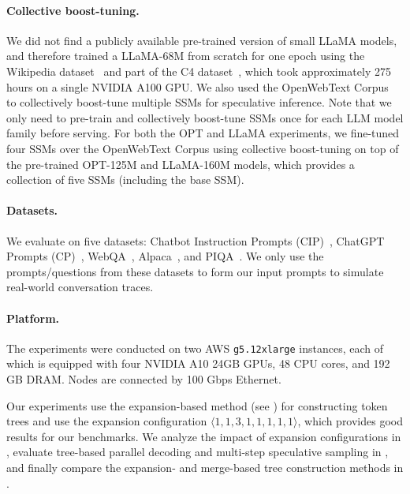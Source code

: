 \paragraph{Collective boost-tuning.}
\label{specinfer:sec:cbt_method}
We did not find a publicly available pre-trained version of small LLaMA models, and therefore trained a LLaMA-68M from scratch for one epoch using the Wikipedia dataset~\cite{wikidump} and part of the C4 dataset~\cite{2019t5}, which took approximately 275 hours on a single NVIDIA A100 GPU.
We also used the OpenWebText Corpus~\cite{Gokaslan2019OpenWeb} to collectively boost-tune multiple SSMs for speculative inference.
Note that we only need to pre-train and collectively boost-tune SSMs once for each LLM model family before serving.
For both the OPT and LLaMA experiments, we fine-tuned four SSMs over the OpenWebText Corpus using collective boost-tuning on top of the pre-trained OPT-125M and LLaMA-160M models, which provides a collection of five SSMs (including the base SSM).

\paragraph{Datasets.} We evaluate \SpecInfer on five datasets: Chatbot Instruction Prompts (CIP)~\cite{chatbot2023}, ChatGPT Prompts (CP)~\cite{mohamed2023chatgpt}, WebQA~\cite{berant-etal-2013-semantic}, Alpaca~\cite{alpaca,peng2023instruction}, and PIQA~\cite{Bisk2020}.
We only use the prompts/questions from these datasets to form our input prompts to simulate real-world conversation traces.

\paragraph{Platform.} The experiments were conducted on two AWS {\tt g5.12xlarge} instances, each of which is equipped with four NVIDIA A10 24GB GPUs, 48 CPU cores, and 192 GB DRAM. Nodes are connected by 100 Gbps Ethernet.

Our experiments use the expansion-based method (see ) for constructing token trees and use the expansion configuration $\langle 1, 1, 3, 1, 1, 1, 1, 1\rangle$, which provides good results for our benchmarks. We analyze the impact of expansion configurations in , evaluate tree-based parallel decoding and multi-step speculative sampling in , and finally compare the expansion- and merge-based tree construction methods in .

